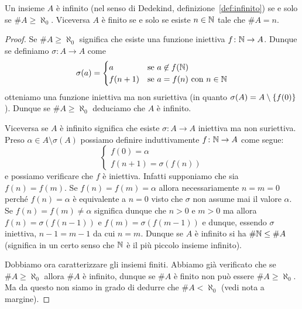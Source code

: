 \begin{theorem}
Un insieme $A$ è infinito (nel senso di Dedekind, definizione~\ref{def:infinito})
se e solo se $\# A \ge \aleph_0$.
Viceversa $A$ è finito se e solo se esiste $n\in{\mathbb N}$ tale che $\# A = n$.
\end{theorem}
%
\begin{proof}
Se $\#A \ge \aleph_0$ significa che esiste una funzione 
iniettiva $f\colon {\mathbb N}\to A$. 
Dunque se definiamo $\sigma \colon A \to A$ come
\[
\sigma(a) = \begin{cases}
  a & \text{se $a\not\in f({\mathbb N})$}\\
  f(n+1) & \text{se $a=f(n)$ con $n\in{\mathbb N}$}
\end{cases}
\]
otteniamo una funzione iniettiva ma non suriettiva 
(in quanto $\sigma(A) = A\setminus{\left\{ f(0) \right\}}$).
Dunque se $\#A\ge \aleph_0$ deduciamo che $A$ è infinito.

Viceversa se $A$ è infinito significa che esiste $\sigma\colon A \to A$ 
iniettiva ma non suriettiva. 
Preso $\alpha \in A \setminus\sigma(A)$
possiamo definire induttivamente $f\colon {\mathbb N}\to A$ come segue:
\[
\begin{cases}
  f(0) = \alpha\\
  f(n+1) = \sigma(f(n))
\end{cases}
\]
e possiamo verificare che $f$ è iniettiva. 
Infatti supponiamo che sia $f(n)=f(m)$.
Se $f(n)=f(m)=\alpha$ allora necessariamente $n=m=0$ 
perché $f(n)=\alpha$ è equivalente a $n=0$ visto che $\sigma$
non assume mai il valore $\alpha$.
Se $f(n)=f(m)\neq \alpha$ significa dunque che $n>0$ e $m>0$
ma allora $f(n)=\sigma(f(n-1))$ e $f(m)=\sigma(f(m-1))$
e dunque, essendo $\sigma$ iniettiva, $n-1=m-1$ da cui $n=m$. 
Dunque se $A$ è infinito si ha $\#{\mathbb N}\le \#A$
(significa in un certo senso che ${\mathbb N}$ è il più piccolo insieme infinito).

Dobbiamo ora caratterizzare gli insiemi finiti.
Abbiamo già verificato che se $\#A \ge \aleph_0$ 
allora $\#A$ è infinito, dunque se $\#A$ è finito 
non può essere $\#A \ge \aleph_0$.
Ma da questo non siamo in grado di dedurre che $\#A < \aleph_0$ (vedi nota a margine).%
%


\end{proof}
